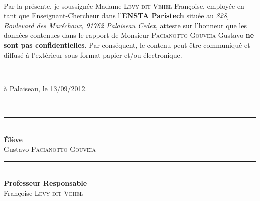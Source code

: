 \thispagestyle{empty}
\vspace*{\fill}
{\\[0.2cm]

	\begin{minipage}[c]{\textwidth}
	\center
	Par la présente, je soussignée Madame \textsc{Levy-dit-Vehel} Françoise, employée en tant que Enseignant-Chercheur dans l'\textbf{ENSTA Paristech} située au \textit{828, Boulevard des Maréchaux, 91762 Palaiseau Cedex}, atteste sur l'honneur que les données contenues dans le rapport de Monsieur \textsc{Pacianotto Gouveia} Gustavo \textbf{ne sont pas confidentielles}. Par conséquent, le contenu peut être communiqué et diffusé à l'extérieur sous format papier et/ou électronique.

      	\end{minipage}
}\\[3cm]

\begin{minipage}{0.95\textwidth}
\hfill à Palaiseau, le 13/09/2012.
\end{minipage}\\[1cm]
	\begin{minipage}{1.1\textwidth}
		\noindent\begin{minipage}{0.45\textwidth}
			\begin{flushleft} 

				{\center \rule{5cm}{1pt}	}\\
				\textbf{Élève}\\
				Gustavo \textsc{Pacianotto Gouveia}\\

				
			\end{flushleft}
		\end{minipage}
		\begin{minipage}{0.45\textwidth}
			\begin{flushright} 

				{\center \rule{5cm}{1pt}	}\\
				\textbf{Professeur Responsable} \\
				Françoise \textsc{Levy-dit-Vehel} \\


			\end{flushright}
		\end{minipage}
	\end{minipage}


\vspace*{\fill}
\newpage
